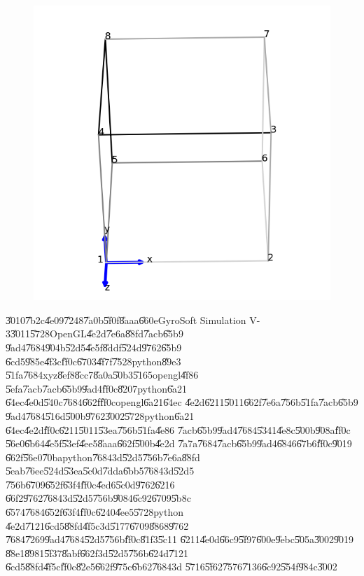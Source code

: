 \begin{figure}[th]
\begin{center}
{\includegraphics{./figs/construct_cube_8vertices_opengl.png}}
\end{center}
\end{figure}

\bigskip

\U{3010}\U{7b2c}\U{4e09}\U{7248}\U{7a0b}\U{5f0f}\U{8aaa}\U{660e}GyroSoft
Simulation V-3\U{3011}\U{5728}OpenGL\U{4e2d}\U{7e6a}\U{88fd}\U{7acb}\U{65b9}%
\U{9ad4}\U{7684}\U{904b}\U{52d5}\U{4e5f}\U{8ddf}\U{524d}\U{9762}\U{65b9}%
\U{6cd5}\U{985e}\U{4f3c}\U{ff0c}\U{6703}\U{4f7f}\U{7528}python\U{89e3}%
\U{51fa}\U{7684}xyz\U{8ef8}\U{8cc7}\U{8a0a}\U{50b3}\U{5165}opengl\U{4f86}%
\U{5efa}\U{7acb}\U{7acb}\U{65b9}\U{9ad4}\U{ff0c}\U{8207}python\U{6a21}%
\U{64ec}\U{4e0d}\U{540c}\U{7684}\U{662f}\U{ff0c}opengl\U{6a21}\U{64ec}%
\U{4e2d}\U{6211}\U{5011}\U{662f}\U{7e6a}\U{756b}\U{51fa}\U{7acb}\U{65b9}%
\U{9ad4}\U{7684}\U{516d}\U{500b}\U{9762}\U{3002}\U{5728}python\U{6a21}%
\U{64ec}\U{4e2d}\U{ff0c}\U{6211}\U{5011}\U{53ea}\U{756b}\U{51fa}\U{4e86}%
\U{7acb}\U{65b9}\U{9ad4}\U{7684}\U{5341}\U{4e8c}\U{500b}\U{908a}\U{ff0c}%
\U{56e0}\U{6b64}\U{4e5f}\U{53ef}\U{4ee5}\U{8aaa}\U{662f}\U{500b}\U{4e2d}%
\U{7a7a}\U{7684}\U{7acb}\U{65b9}\U{9ad4}\U{6846}\U{67b6}\U{ff0c}\U{9019}%
\U{662f}\U{56e0}\U{70ba}python\U{7684}3d\U{52d5}\U{756b}\U{7e6a}\U{88fd}%
\U{5eab}\U{76ee}\U{524d}\U{53ea}\U{5c0d}\U{7dda}\U{6bb5}\U{7684}3d\U{52d5}%
\U{756b}\U{6709}\U{652f}\U{63f4}\U{ff0c}\U{4ed6}\U{5c0d}\U{9762}\U{6216}%
\U{66f2}\U{9762}\U{7684}3d\U{52d5}\U{756b}\U{9084}\U{6c92}\U{6709}\U{5b8c}%
\U{6574}\U{7684}\U{652f}\U{63f4}\U{ff0c}\U{6240}\U{4ee5}\U{5728}python%
\U{4e2d}\U{7121}\U{6cd5}\U{88fd}\U{4f5c}3d\U{5177}\U{6709}\U{8868}\U{9762}%
\U{7684}\U{7269}\U{9ad4}\U{7684}\U{52d5}\U{756b}\U{ff0c}\U{81f3}\U{5c11}%
\U{6211}\U{4e0d}\U{66c9}\U{5f97}\U{600e}\U{9ebc}\U{505a}\U{3002}\U{9019}%
\U{88e1}\U{8981}\U{5f37}\U{8abf}\U{662f}3d\U{52d5}\U{756b}\U{624d}\U{7121}%
\U{6cd5}\U{88fd}\U{4f5c}\U{ff0c}\U{82e5}\U{662f}\U{975c}\U{6b62}\U{7684}3d%
\U{5716}\U{5f62}\U{7576}\U{7136}\U{6c92}\U{554f}\U{984c}\U{3002}

